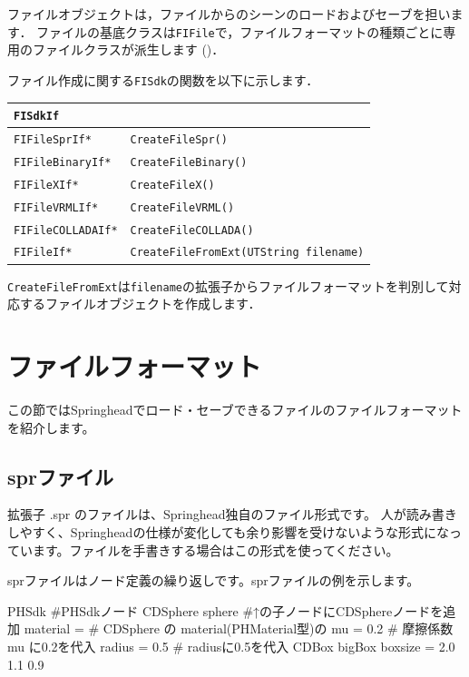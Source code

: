 \KLUDGE ファイルオブジェクトは，ファイルからのシーンのロードおよびセーブを担います．
\KLUDGE ファイルの基底クラスは\texttt{FIFile}\KLUDGE で，ファイルフォーマットの種類ごとに専用のファイルクラスが派生します
()\KLUDGE ．

\KLUDGE ファイル作成に関する\texttt{FISdk}\KLUDGE の関数を以下に示します．

\begin{center}
\begin{tabular}{p{.3\hsize}p{.6\hsize}}
\texttt{FISdkIf}															\\ \midrule
\texttt{FIFileSprIf*}		& \texttt{CreateFileSpr()}						\\
\texttt{FIFileBinaryIf*} 	& \texttt{CreateFileBinary()}					\\
\texttt{FIFileXIf*}			& \texttt{CreateFileX()}						\\
\texttt{FIFileVRMLIf*}		& \texttt{CreateFileVRML()}						\\
\texttt{FIFileCOLLADAIf*}	& \texttt{CreateFileCOLLADA()}					\\
\texttt{FIFileIf*}			& \texttt{CreateFileFromExt(UTString filename)}	\\
\end{tabular}
\end{center}

\texttt{CreateFileFromExt}\KLUDGE は\texttt{filename}\KLUDGE の拡張子からファイルフォーマットを判別して対応するファイルオブジェクトを作成します．

\section{\KLUDGE ファイルフォーマット}
\KLUDGE この節ではSpringhead\KLUDGE でロード・セーブできるファイルのファイルフォーマットを紹介します。

\subsection{spr\KLUDGE ファイル}
\KLUDGE 拡張子 .spr \KLUDGE のファイルは、Springhead\KLUDGE 独自のファイル形式です。
\KLUDGE 人が読み書きしやすく、Springhead\KLUDGE の仕様が変化しても余り影響を受けないような形式になっています。ファイルを手書きする場合はこの形式を使ってください。

spr\KLUDGE ファイルはノード定義の繰り返しです。spr\KLUDGE ファイルの例を示します。

\begin{sourcecode}
PHSdk{                  #PHSdkノード
    CDSphere sphere{    #↑の子ノードにCDSphereノードを追加
        material = {    # CDSphere の material(PHMaterial型)の
            mu = 0.2    # 摩擦係数 mu に0.2を代入
        }
        radius = 0.5    # radiusに0.5を代入
    }
    CDBox bigBox{
        boxsize = 2.0 1.1 0.9
    }
}
\end{sourcecode}


